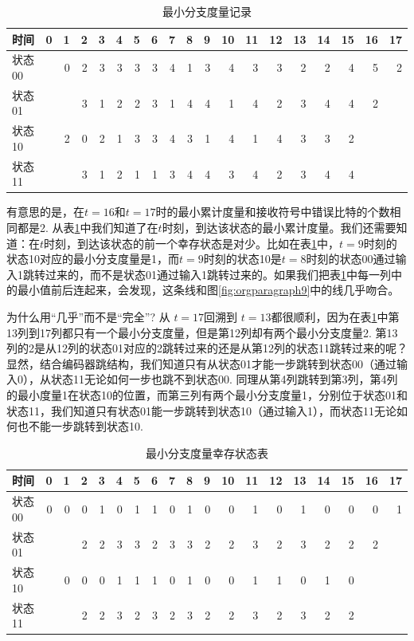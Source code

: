 \documentclass[10pt,a4paper,UTF8]{article}
\begin{document}
\begin{table}[htb]
\caption{\label{tab:orgtable1}
最小分支度量记录}
\centering
\begin{tabular}{lrrrrrrrrrrrrrrrrrr}
时间 & 0 & 1 & 2 & 3 & 4 & 5 & 6 & 7 & 8 & 9 & 10 & 11 & 12 & 13 & 14 & 15 & 16 & 17\\
\hline
状态00 &  & 0 & 2 & 3 & 3 & 3 & 3 & 4 & 1 & 3 & 4 & 3 & 3 & 2 & 2 & 4 & 5 & 2\\
状态01 &  &  & 3 & 1 & 2 & 2 & 3 & 1 & 4 & 4 & 1 & 4 & 2 & 3 & 4 & 4 & 2 & \\
状态10 &  & 2 & 0 & 2 & 1 & 3 & 3 & 4 & 3 & 1 & 4 & 1 & 4 & 3 & 3 & 2 &  & \\
状态11 &  &  & 3 & 1 & 2 & 1 & 1 & 3 & 4 & 4 & 3 & 4 & 2 & 3 & 4 & 4 &  & \\
\end{tabular}
\end{table}


有意思的是，在\(t=16\)和\(t=17\)时的最小累计度量和接收符号中错误比特的个数相同都是2. 从表\ref{tab:orgtable1}中我们知道了在\(t\)时刻，到达该状态的最小累计度量。我们还需要知道：在\(t\)时刻，到达该状态的前一个幸存状态是对少。比如在表\ref{tab:orgtable1}中，\(t=9\)时刻的状态10对应的最小分支度量是1，而\(t=9\)时刻的状态10是\(t=8\)时刻的状态00通过输入1跳转过来的，而不是状态01通过输入1跳转过来的。如果我们把表\ref{tab:orgtable1}中每一列中的最小值前后连起来，会发现，这条线和图\ref{fig:orgparagraph9}中的线几乎吻合。

为什么用“几乎”而不是“完全”? 从 \(t=17\)回溯到 \(t=13\)都很顺利，因为在表\ref{tab:orgtable1}中第13列到17列都只有一个最小分支度量，但是第12列却有两个最小分支度量2. 第13列的2是从12列的状态01对应的2跳转过来的还是从第12列的状态11跳转过来的呢？显然，结合编码器跳结构，我们知道只有从状态01才能一步跳转到状态00（通过输入0），从状态11无论如何一步也跳不到状态00. 同理从第4列跳转到第3列，第4列的最小度量1在状态10的位置，而第三列有两个最小分支度量1，分别位于状态01和状态11，我们知道只有状态01能一步跳转到状态10（通过输入1），而状态11无论如何也不能一步跳转到状态10.

\begin{table}[htb]
\caption{\label{tab:orgtable2}
最小分支度量幸存状态表}
\centering
\begin{tabular}{lrrrrrrrrrrrrrrrrrr}
时间 & 0 & 1 & 2 & 3 & 4 & 5 & 6 & 7 & 8 & 9 & 10 & 11 & 12 & 13 & 14 & 15 & 16 & 17\\
\hline
状态00 & 0 & 0 & 0 & 1 & 0 & 1 & 1 & 0 & 1 & 0 & 0 & 1 & 0 & 1 & 0 & 0 & 0 & 1\\
状态01 &  &  & 2 & 2 & 3 & 3 & 2 & 3 & 3 & 2 & 2 & 3 & 2 & 3 & 2 & 2 & 2 & \\
状态10 &  & 0 & 0 & 0 & 1 & 1 & 1 & 0 & 1 & 0 & 0 & 1 & 1 & 0 & 1 & 0 &  & \\
状态11 &  &  & 2 & 2 & 3 & 2 & 3 & 2 & 3 & 2 & 2 & 3 & 2 & 3 & 2 & 2 &  & \\
\end{tabular}
\end{table}
\end{document}

